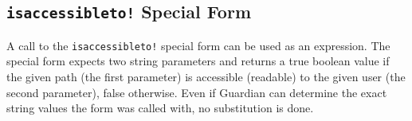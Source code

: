 
\subsection{\texttt{isaccessibleto!} Special Form}
{
	A call to the \texttt{isaccessibleto!} special form
	can be used as an expression.
	The special form expects two string parameters and returns a true boolean
	value if the given path (the first parameter) is accessible (readable) to
	the given user (the second parameter), false
	otherwise.
	Even if Guardian can determine the exact string values the form was
	called with, no substitution is done.
}

